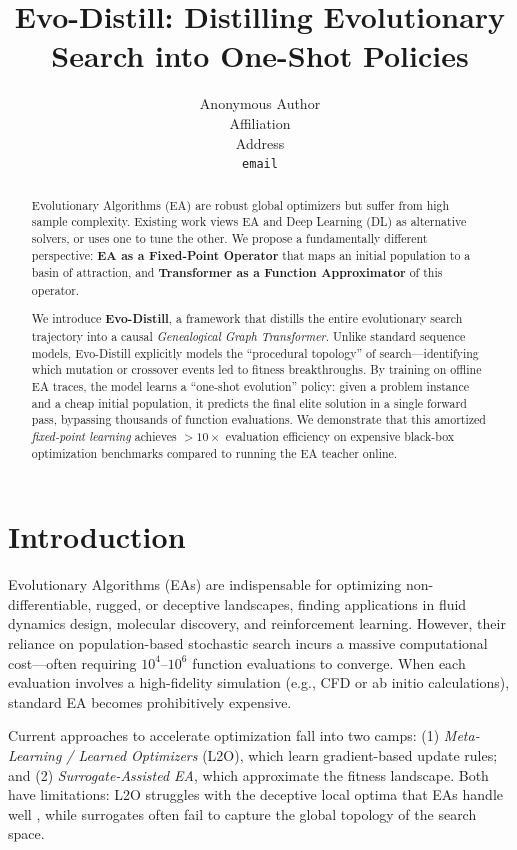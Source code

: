 \documentclass{article}
\title{Evo-Distill: Distilling Evolutionary Search into One-Shot Policies}
\author{%
  Anonymous Author \\
  Affiliation \\
  Address \\
  \texttt{email} \\
}
\date{}
\begin{document}
\maketitle

\begin{abstract}
Evolutionary Algorithms (EA) are robust global optimizers but suffer from high sample complexity. Existing work views EA and Deep Learning (DL) as alternative solvers, or uses one to tune the other. We propose a fundamentally different perspective: \textbf{EA as a Fixed-Point Operator} that maps an initial population to a basin of attraction, and \textbf{Transformer as a Function Approximator} of this operator.

We introduce \textbf{Evo-Distill}, a framework that distills the entire evolutionary search trajectory into a causal \emph{Genealogical Graph Transformer}. Unlike standard sequence models, Evo-Distill explicitly models the ``procedural topology'' of search---identifying which mutation or crossover events led to fitness breakthroughs. By training on offline EA traces, the model learns a ``one-shot evolution'' policy: given a problem instance and a cheap initial population, it predicts the final elite solution in a single forward pass, bypassing thousands of function evaluations. We demonstrate that this amortized \emph{fixed-point learning} achieves $>10\times$ evaluation efficiency on expensive black-box optimization benchmarks compared to running the EA teacher online.
\end{abstract}

\section{Introduction}
\label{sec:intro}

Evolutionary Algorithms (EAs) are indispensable for optimizing non-differentiable, rugged, or deceptive landscapes, finding applications in fluid dynamics design, molecular discovery, and reinforcement learning. However, their reliance on population-based stochastic search incurs a massive computational cost---often requiring $10^4$--$10^6$ function evaluations to converge. When each evaluation involves a high-fidelity simulation (e.g., CFD or ab initio calculations), standard EA becomes prohibitively expensive.

Current approaches to accelerate optimization fall into two camps: (1) \emph{Meta-Learning / Learned Optimizers} (L2O), which learn gradient-based update rules; and (2) \emph{Surrogate-Assisted EA}, which approximate the fitness landscape. Both have limitations: L2O struggles with the deceptive local optima that EAs handle well \cite{metz2022learned}, while surrogates often fail to capture the global topology of the search space.
\end{document}
